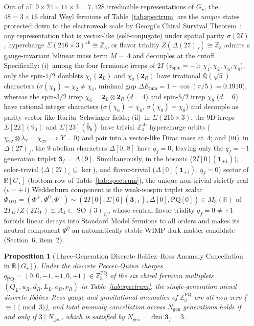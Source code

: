 \documentclass[11pt,a4paper]{article}
\newtheorem{proposition}[theorem]{Proposition}
\theoremstyle{definition}
\theoremstyle{remark}
\newcommand{\R}{\mathbb{R}}
\newcommand{\Z}{\mathbb{Z}}
\newcommand{\Q}{\mathbb{Q}}
\newcommand{\SO}{\operatorname{SO}}
\newcommand{\Gstar}{G_\star}
\begin{document}
Out of all $9 \times 24 \times 11 \times 3 = 7{,}128$ irreducible representations of $\Gstar$, the $48 = 3 \times 16$ chiral Weyl fermions of Table~\ref{tab:spectrum} are the \emph{unique} states protected down to the electroweak scale by Georgi's Chiral Survival Theorem~\cite{Georgi1979}: any representation that is vector-like (self-conjugate) under spatial parity $\sigma(2I)$, hypercharge $\Sigma(216 \times 3)^{\mathrm{ab}} \cong \Z_3$, or flavor triality $Z(\Delta(27)_f) \cong \Z_3$ admits a gauge-invariant bilinear mass term $M \sim \Lambda$ and decouples at the cutoff. Specifically: (i)~among the four fermionic irreps of $2I$ ($z_{\mathrm{spin}} = -1$: $\chi_1, \chi_2, \chi_6, \chi_8$), only the spin-$1/2$ doublets $\chi_1(\mathbf{2}_L)$ and $\chi_2(\mathbf{2}_R)$ have irrational $\Q(\sqrt{5})$ characters ($\sigma(\chi_1) = \chi_2 \neq \chi_1$, minimal gap $\Delta E_{\min} = 1 - \cos(\pi/5) = 0.1910$), whereas the spin-$3/2$ irrep $\chi_6 = \mathbf{2}_L \otimes \mathbf{2}_R$ ($d = 4$) and spin-$5/2$ irrep $\chi_8$ ($d = 6$) have rational integer characters ($\sigma(\chi_6) = \chi_6$, $\sigma(\chi_8) = \chi_8$) and decouple as parity vector-like Rarita--Schwinger fields; (ii)~in $\Sigma(216 \times 3)$, the $9$D irreps $\Sigma[22](9_0)$ and $\Sigma[23](\bar{9}_0)$ have trivial $\Z_3^{\mathrm{ab}}$ hypercharge orbits ($\chi_{22} \otimes \lambda_Y = \chi_{22} \implies Y = 0$) and pair into a vector-like Dirac mass at $\Lambda$; and (iii)~in $\Delta(27)_f$, the $9$ abelian characters $\Delta[0..8]$ have $q_f = 0$, leaving only the $q_f = +1$ generation triplet $\mathbf{3}_f = \Delta[9]$. Simultaneously, in the bosonic ($2I[0](\mathbf{1}_{+1})$), color-trivial ($\Delta(27)_c \subseteq \ker$), and flavor-trivial ($\Delta[0](\mathbf{1}_{+1})$, $q_f = 0$) sector of $\R[\Gstar]$ (bottom row of Table~\ref{tab:spectrum}), the unique non-trivial strictly real ($\iota = +1$) Wedderburn component is the weak-isospin triplet scalar $\Phi_{\mathrm{DM}} = (\Phi^+, \Phi^0, \Phi^-) \sim (2I[0], \Sigma[6](\mathbf{3}_{+1}), \Delta[0], \mathrm{PQ}[0]) \in M_3(\R)$ of $2T_W / Z(2T_W) \cong A_4 \subset \SO(3)_W$, whose central flavor triality $q_f = 0 \neq +1$ forbids linear decays into Standard Model fermions to all orders and makes its neutral component $\Phi^0$ an automatically stable WIMP dark matter candidate (Section~6, item~2).

\begin{proposition}[Three-Generation Discrete Ib\'a\~nez--Ross Anomaly Cancellation in {$\R[\Gstar]$}]
\label{prop:anomaly_cancellation}
Under the discrete Peccei--Quinn charges $q_{\mathrm{PQ}} = (0, 0, -1, +1, 0, +1) \in \Z_3^{\mathrm{PQ}}$ of the six chiral fermion multiplets $(Q_L, u_R, d_R, L_L, e_R, \nu_R)$ in Table~\ref{tab:spectrum}, the single-generation mixed discrete Ib\'a\~nez--Ross gauge and gravitational anomalies of $\Z_3^{\mathrm{PQ}}$ are all non-zero ($\equiv 1 \pmod 3$), and total anomaly cancellation across $N_{\mathrm{gen}}$ generations holds if and only if $3 \mid N_{\mathrm{gen}}$, which is satisfied by $N_{\mathrm{gen}} = \dim\mathbf{3}_f = 3$.
\end{proposition}
\end{document}
